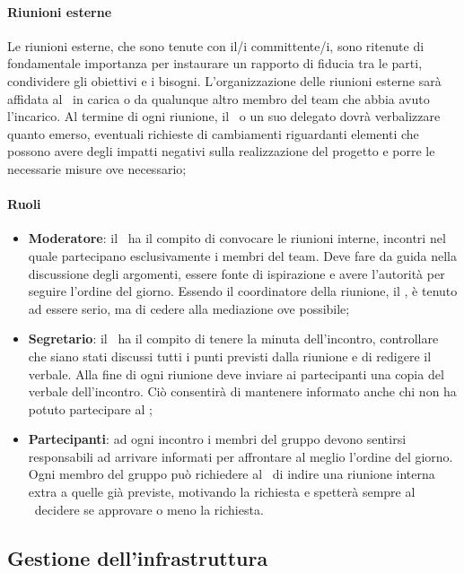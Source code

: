 \documentclass[../NormeDiProgetto_v4.0.0.tex]{subfiles}
\begin{document}
			\paragraph{Riunioni esterne}
				Le riunioni esterne, che sono tenute con il/i committente/i, sono ritenute di fondamentale importanza per instaurare un rapporto di fiducia tra le parti, condividere gli obiettivi e i bisogni.
				L'organizzazione delle riunioni esterne sarà affidata al \responsabilediprogetto\ in carica o da qualunque altro membro del team che abbia avuto l'incarico.
				Al termine di ogni riunione, il \responsabilediprogetto\ o un suo delegato dovrà verbalizzare quanto emerso, eventuali richieste di cambiamenti riguardanti elementi che possono avere degli impatti negativi sulla realizzazione del progetto e porre le necessarie misure ove necessario;
					\paragraph{Ruoli}
						\begin{itemize}
							\item \textbf{Moderatore}: il \responsabilediprogetto\ ha il compito di convocare le riunioni interne, incontri nel quale partecipano esclusivamente i membri del team. Deve fare da guida nella discussione degli argomenti, essere fonte di ispirazione e avere l'autorità per seguire l'ordine del giorno.
				Essendo il coordinatore della riunione, il \responsabilediprogetto, è tenuto ad essere serio, ma di cedere alla mediazione ove possibile;
							\item \textbf{Segretario}: il \segretario\ ha il compito di tenere la minuta dell'incontro, controllare che siano stati discussi tutti i punti previsti dalla riunione e di redigere il verbale. Alla fine di ogni riunione deve inviare ai partecipanti una copia del verbale dell'incontro. Ciò consentirà di mantenere informato anche chi non ha potuto partecipare al ;
							\item \textbf{Partecipanti}: ad ogni incontro i membri del gruppo devono sentirsi responsabili ad arrivare informati per affrontare al meglio l'ordine del giorno.
				Ogni membro del gruppo può richiedere al \responsabilediprogetto\ di indire una riunione interna extra a quelle già previste, motivando la richiesta e spetterà sempre al \responsabilediprogetto\ decidere se approvare o meno la richiesta.
				\end{itemize}
	
	\subsection{Gestione dell'infrastruttura}
\end{document}
